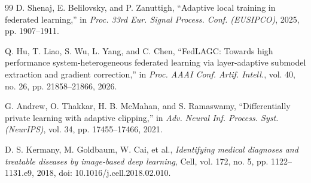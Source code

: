 \documentclass[conference]{IEEEtran}
\begin{document}
\begin{thebibliography}{99}
D. Shenaj, E. Belilovsky, and P. Zanuttigh, ``Adaptive local training in federated learning,'' in \textit{Proc. 33rd Eur. Signal Process. Conf. (EUSIPCO)}, 2025, pp. 1907--1911.

Q. Hu, T. Liao, S. Wu, L. Yang, and C. Chen, ``FedLAGC: Towards high performance system-heterogeneous federated learning via layer-adaptive submodel extraction and gradient correction,'' in \textit{Proc. AAAI Conf. Artif. Intell.}, vol. 40, no. 26, pp. 21858--21866, 2026.

G. Andrew, O. Thakkar, H. B. McMahan, and S. Ramaswamy, ``Differentially private learning with adaptive clipping,'' in \textit{Adv. Neural Inf. Process. Syst. (NeurIPS)}, vol. 34, pp. 17455--17466, 2021.

D. S. Kermany, M. Goldbaum, W. Cai, et al., \textit{Identifying medical diagnoses and treatable diseases by image-based deep learning}, Cell, vol. 172, no. 5, pp. 1122--1131.e9, 2018, doi: 10.1016/j.cell.2018.02.010.

\end{thebibliography}
\end{document}
